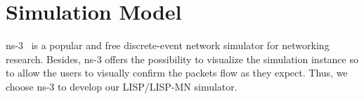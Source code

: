 \section{Simulation Model}\label{sec:sim_model}

ns-3~\cite{ns3} is a popular and free discrete-event network simulator for networking research. %
Besides, ns-3 offers the possibility to visualize the simulation instance so to allow the users to visually confirm the packets flow as they expect. Thus, we choose ns-3 to develop our LISP/LISP-MN simulator.


